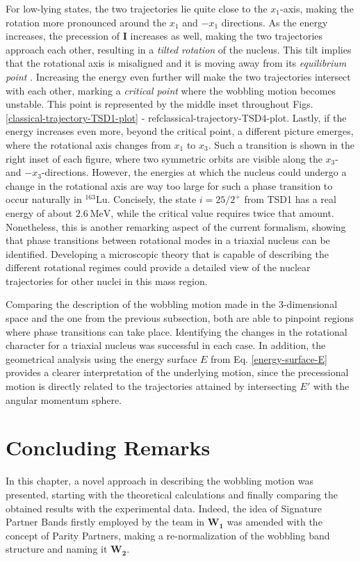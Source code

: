 For low-lying states, the two trajectories lie quite close to the $x_1$-axis, making the rotation more pronounced around the $x_1$ and $-x_1$ directions. As the energy increases, the precession of $\mathbf{I}$ increases as well, making the two trajectories approach each other, resulting in a \emph{tilted rotation} of the nucleus. This tilt implies that the rotational axis is misaligned and it is moving away from its \emph{equilibrium point} \cite{poenaru2021extensive2}. Increasing the energy even further will make the two trajectories intersect with each other, marking a \emph{critical point} where the wobbling motion becomes unstable. This point is represented by the middle inset throughout Figs. \ref{classical-trajectory-TSD1-plot} - ref{classical-trajectory-TSD4-plot}. Lastly, if the energy increases even more, beyond the critical point, a different picture emerges, where the rotational axis changes from $x_1$ to $x_3$. Such a transition is shown in the right inset of each figure, where two symmetric orbits are visible along the $x_3$- and $-x_3$-directions. However, the energies at which the nucleus could undergo a change in the rotational axis are way too large for such a phase transition to occur naturally in $^{163}$Lu. Concisely, the state $i=25/2^+$ from TSD1 has a real energy of about $2.6\ \text{MeV}$, while the critical value requires twice that amount. Nonetheless, this is another remarking aspect of the current formalism, showing that phase transitions between rotational modes in a triaxial nucleus can be identified. Developing a microscopic theory that is capable of describing the different rotational regimes could provide a detailed view of the nuclear trajectories for other nuclei in this mass region.

Comparing the description of the wobbling motion made in the 3-dimensional space and the one from the previous subsection, both are able to pinpoint regions where phase transitions can take place. Identifying the changes in the rotational character for a triaxial nucleus was successful in each case. In addition, the geometrical analysis using the energy surface $E$ from Eq. \ref{energy-surface-E} provides a clearer interpretation of the underlying motion, since the precessional motion is directly related to the trajectories attained by intersecting $E'$ with the angular momentum sphere.

\section{Concluding Remarks}

In this chapter, a novel approach in describing the wobbling motion was presented, starting with the theoretical calculations and finally comparing the obtained results with the experimental data. Indeed, the idea of Signature Partner Bands firstly employed by the team in $\mathbf{W_1}$ was amended with the concept of Parity Partners, making a re-normalization of the wobbling band structure and naming it $\mathbf{W_2}$.